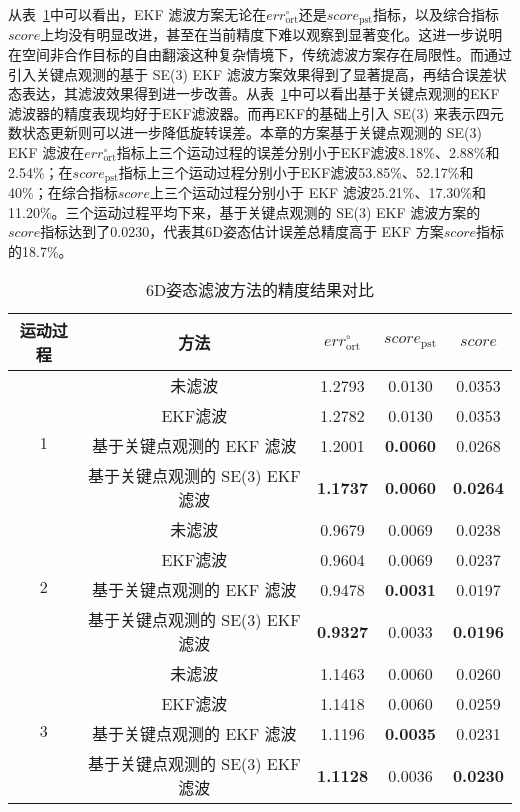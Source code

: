 从表~\ref{tab:caseekfcmp}中可以看出，EKF 滤波方案无论在$err_{\text{ort}}^{\circ}$还是$score_{\text{pst}}$指标，以及综合指标$score$上均没有明显改进，甚至在当前精度下难以观察到显著变化。这进一步说明在空间非合作目标的自由翻滚这种复杂情境下，传统滤波方案存在局限性。而通过引入关键点观测的基于 SE(3) EKF 滤波方案效果得到了显著提高，再结合误差状态表达，其滤波效果得到进一步改善。从表~\ref{tab:caseekfcmp}中可以看出基于关键点观测的EKF滤波器的精度表现均好于EKF滤波器。而再EKF的基础上引入 SE(3) 来表示四元数状态更新则可以进一步降低旋转误差。本章的方案基于关键点观测的 SE(3) EKF 滤波在$err_{\text{ort}}^{\circ}$指标上三个运动过程的误差分别小于EKF滤波8.18\%、2.88\%和2.54\%；在$score_{\text{pst}}$指标上三个运动过程分别小于EKF滤波53.85\%、52.17\%和40\%；在综合指标$score$上三个运动过程分别小于 EKF 滤波25.21\%、17.30\%和11.20\%。三个运动过程平均下来，基于关键点观测的 SE(3) EKF 滤波方案的$score$指标达到了0.0230，代表其6D姿态估计误差总精度高于 EKF 方案$score$指标的18.7\%。

\begin{table}[htbp]
	\centering
	\caption{6D姿态滤波方法的精度结果对比}
	\label{tab:caseekfcmp}
	{%
		\begin{tabular}{c c c c c}
			\toprule[1.5pt]
			运动过程 & 方法 
			& $err_{\text{ort}}^{\circ}$ 
			& $score_{\text{pst}}$
			& $score$ \\
			\midrule[1pt]
			\multirow{4}{*}{1} 
			& 未滤波                       & 1.2793 & 0.0130 & 0.0353 \\
			& EKF滤波                       & 1.2782 & 0.0130 & 0.0353 \\
			& 基于关键点观测的 EKF 滤波            & 1.2001 & \textbf{0.0060} & 0.0268 \\
			& 基于关键点观测的 SE(3) EKF滤波       & \textbf{1.1737} & \textbf{0.0060} & \textbf{0.0264} \\
			\midrule[1pt]
			\multirow{4}{*}{2}
			& 未滤波                       & 0.9679 & 0.0069 & 0.0238 \\
			& EKF滤波                       &0.9604 & 0.0069 & 0.0237 \\
			& 基于关键点观测的 EKF 滤波            & 0.9478 & \textbf{0.0031} & 0.0197 \\
			& 基于关键点观测的 SE(3) EKF 滤波      & \textbf{0.9327} & 0.0033 & \textbf{0.0196} \\
			\midrule[1pt]
			\multirow{4}{*}{3}
			& 未滤波                       & 1.1463 & 0.0060 & 0.0260 \\
			& EKF滤波                       & 1.1418 & 0.0060 & 0.0259 \\
			& 基于关键点观测的 EKF 滤波     & 1.1196 & \textbf{0.0035} & 0.0231 \\
			& 基于关键点观测的 SE(3) EKF 滤波      & \textbf{1.1128} & 0.0036 & \textbf{0.0230} \\
			\bottomrule[1.5pt]
		\end{tabular}
	}
\end{table}


